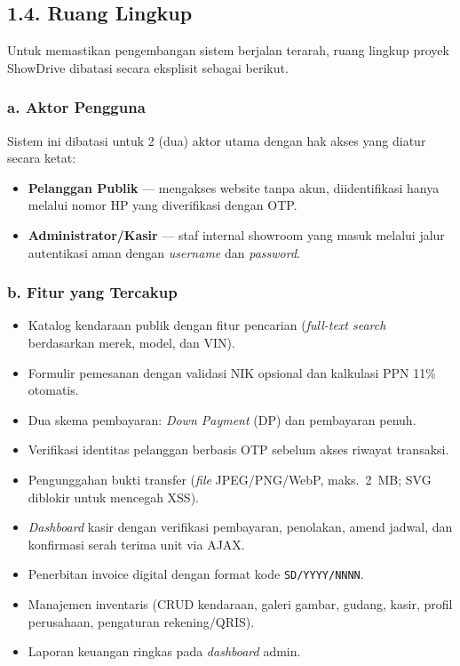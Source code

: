 \documentclass[11pt, a5paper]{article}
\begin{document}
\subsection*{1.4. Ruang Lingkup}

Untuk memastikan pengembangan sistem berjalan terarah, ruang lingkup proyek
ShowDrive dibatasi secara eksplisit sebagai berikut.

\subsubsection*{a. Aktor Pengguna}

Sistem ini dibatasi untuk 2 (dua) aktor utama dengan hak akses yang diatur
secara ketat:
\begin{itemize}
  \item \textbf{Pelanggan Publik} — mengakses website tanpa akun, diidentifikasi
        hanya melalui nomor HP yang diverifikasi dengan OTP.
  \item \textbf{Administrator/Kasir} — staf internal showroom yang masuk melalui
        jalur autentikasi aman dengan \textit{username} dan \textit{password}.
\end{itemize}

\subsubsection*{b. Fitur yang Tercakup}

\begin{itemize}
  \item Katalog kendaraan publik dengan fitur pencarian (\textit{full-text
        search} berdasarkan merek, model, dan VIN).
  \item Formulir pemesanan dengan validasi NIK opsional dan kalkulasi PPN 11\%
        otomatis.
  \item Dua skema pembayaran: \textit{Down Payment} (DP) dan pembayaran penuh.
  \item Verifikasi identitas pelanggan berbasis OTP sebelum akses riwayat
        transaksi.
  \item Pengunggahan bukti transfer (\textit{file} JPEG/PNG/WebP, maks.\ 2~MB;
        SVG diblokir untuk mencegah XSS).
  \item \textit{Dashboard} kasir dengan verifikasi pembayaran, penolakan, amend
        jadwal, dan konfirmasi serah terima unit via AJAX.
  \item Penerbitan invoice digital dengan format kode \texttt{SD/YYYY/NNNN}.
  \item Manajemen inventaris (CRUD kendaraan, galeri gambar, gudang, kasir,
        profil perusahaan, pengaturan rekening/QRIS).
  \item Laporan keuangan ringkas pada \textit{dashboard} admin.
\end{itemize}
\end{document}
